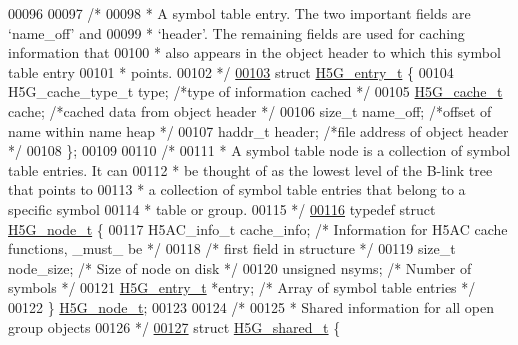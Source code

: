 \begin{DoxyCode}
00096 
00097 \textcolor{comment}{/*}
00098 \textcolor{comment}{ * A symbol table entry.  The two important fields are `name\_off' and}
00099 \textcolor{comment}{ * `header'.  The remaining fields are used for caching information that}
00100 \textcolor{comment}{ * also appears in the object header to which this symbol table entry}
00101 \textcolor{comment}{ * points.}
00102 \textcolor{comment}{ */}
\hyperlink{struct_h5_g__entry__t}{00103} \textcolor{keyword}{struct }\hyperlink{struct_h5_g__entry__t}{H5G\_entry\_t} \{
00104     H5G\_cache\_type\_t type;              \textcolor{comment}{/*type of information cached         */}
00105     \hyperlink{union_h5_g__cache__t}{H5G\_cache\_t} cache;                  \textcolor{comment}{/*cached data from object header     */}
00106     \textcolor{keywordtype}{size\_t}      name\_off;               \textcolor{comment}{/*offset of name within name heap    */}
00107     haddr\_t     header;                 \textcolor{comment}{/*file address of object header      */}
00108 \};
00109 
00110 \textcolor{comment}{/*}
00111 \textcolor{comment}{ * A symbol table node is a collection of symbol table entries.  It can}
00112 \textcolor{comment}{ * be thought of as the lowest level of the B-link tree that points to}
00113 \textcolor{comment}{ * a collection of symbol table entries that belong to a specific symbol}
00114 \textcolor{comment}{ * table or group.}
00115 \textcolor{comment}{ */}
\hyperlink{struct_h5_g__node__t}{00116} \textcolor{keyword}{typedef} \textcolor{keyword}{struct }\hyperlink{struct_h5_g__node__t}{H5G\_node\_t} \{
00117     H5AC\_info\_t cache\_info;     \textcolor{comment}{/* Information for H5AC cache functions, \_must\_ be */}
00118                                 \textcolor{comment}{/* first field in structure */}
00119     \textcolor{keywordtype}{size\_t} node\_size;           \textcolor{comment}{/* Size of node on disk              */}
00120     \textcolor{keywordtype}{unsigned} nsyms;             \textcolor{comment}{/* Number of symbols                 */}
00121     \hyperlink{struct_h5_g__entry__t}{H5G\_entry\_t} *entry;         \textcolor{comment}{/* Array of symbol table entries     */}
00122 \} \hyperlink{struct_h5_g__node__t}{H5G\_node\_t};
00123 
00124 \textcolor{comment}{/*}
00125 \textcolor{comment}{ * Shared information for all open group objects}
00126 \textcolor{comment}{ */}
\hyperlink{struct_h5_g__shared__t}{00127} \textcolor{keyword}{struct }\hyperlink{struct_h5_g__shared__t}{H5G\_shared\_t} \{

\end{DoxyCode}
